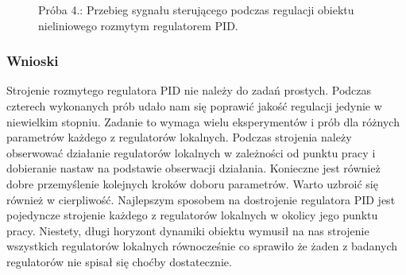 \begin{figure}[b]
    \centering
    \caption{Próba 4.: Przebieg sygnału sterującego podczas regulacji obiektu nieliniowego rozmytym regulatorem PID.}
    \label{pr_4_u}
\end{figure}

\subsubsection{Wnioski}
Strojenie rozmytego regulatora PID nie należy do zadań prostych.
Podczas czterech wykonanych prób udało nam się poprawić jakość regulacji jedynie w niewielkim stopniu. 
Zadanie to wymaga wielu eksperymentów i prób dla różnych parametrów każdego z regulatorów lokalnych. 
Podczas strojenia należy obserwować działanie regulatorów lokalnych w zależności od punktu pracy i 
dobieranie nastaw na podstawie obserwacji działania. 
Konieczne jest również dobre przemyślenie kolejnych kroków doboru parametrów. 
Warto uzbroić się również w cierpliwość. Najlepszym sposobem na dostrojenie regulatora PID jest 
pojedyncze strojenie każdego z regulatorów lokalnych w okolicy jego punktu pracy. Niestety, długi horyzont 
dynamiki obiektu wymusił na nas strojenie wszystkich regulatorów lokalnych równocześnie co sprawiło że 
żaden z badanych regulatorów nie spisał się choćby dostatecznie.
